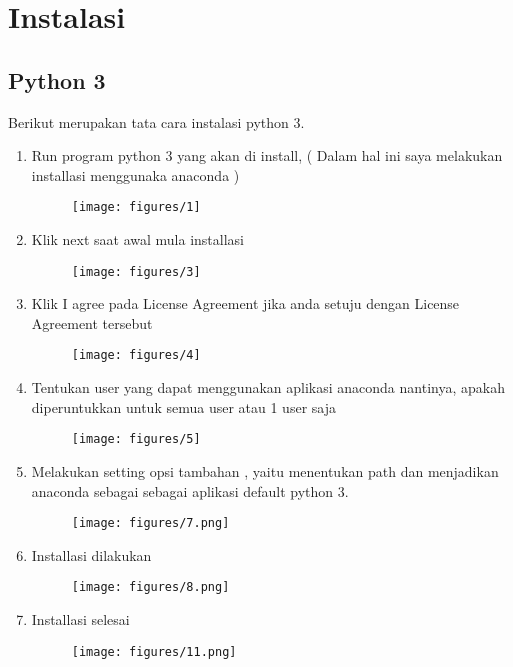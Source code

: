 \chapter{Instalasi}
\section{Python 3}
Berikut merupakan tata cara instalasi python 3.
\begin{enumerate}
\item Run program python 3 yang akan di install, ( Dalam hal ini saya melakukan installasi menggunaka anaconda )
\begin{figure}[H]
    \centering
    \texttt{[image: figures/1]}
    \label{1}
\end{figure}

\item Klik next saat awal mula installasi
\begin{figure}[H]
    \centering
    \texttt{[image: figures/3]}
    \label{3}
\end{figure}

\item Klik I agree pada License Agreement jika anda setuju dengan License Agreement tersebut
\begin{figure}[H]
    \centering
    \texttt{[image: figures/4]}
    \label{4}
\end{figure}

\item Tentukan user yang dapat menggunakan aplikasi anaconda nantinya, apakah diperuntukkan untuk semua user atau 1 user saja
\begin{figure}[H]
    \centering
    \texttt{[image: figures/5]}
    \label{5}
\end{figure}

\item Melakukan setting opsi tambahan , yaitu menentukan path dan menjadikan anaconda sebagai sebagai aplikasi default python 3.
\begin{figure}[H]
    \centering
    \texttt{[image: figures/7.png]}
    \label{7}
\end{figure}

\item Installasi dilakukan
\begin{figure}[H]
    \centering
    \texttt{[image: figures/8.png]}
    \label{8}
\end{figure}


\item Installasi selesai
\begin{figure}[H]
    \centering
    \texttt{[image: figures/11.png]}
    \label{11}
\end{figure}
\end{enumerate}

